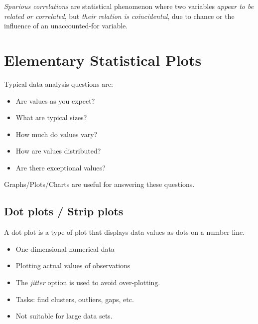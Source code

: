 \begin{remark}
    \emph{Spurious correlations} are statistical phenomenon where two variables
    \emph{appear to be related or correlated}, but \emph{their relation is coincidental}, due to chance
    or the influence of an unaccounted-for variable.
\end{remark}

\section{Elementary Statistical Plots}

Typical data analysis questions are:
\begin{itemize}
    \item Are values as you expect?
    \item What are typical sizes?
    \item How much do values vary?
    \item How are values distributed?
    \item Are there exceptional values?
\end{itemize}

Graphs/Plots/Charts are useful for answering these questions.

\subsection{Dot plots / Strip plots}
\begin{definition}
    A dot plot is a type of plot that displays data values as dots on a number line.

    \begin{itemize}
        \item One-dimensional numerical data
        \item Plotting actual values of observations
        \item The \emph{jitter} option is used to avoid over-plotting.
        \item Tasks: find clusters, outliers, gaps, etc.
        \item Not suitable for large data sets.
    \end{itemize}
\end{definition}

